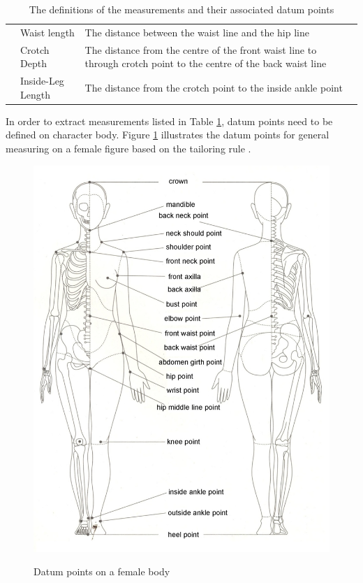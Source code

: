 \begin{table}[H]
\begin{tabular}{|m{0.5cm}|m{3cm}|m{8.5cm}|}
   \cline{2-3}	
   										& Waist length & The distance between the waist line and the hip line\\

   \cline{2-3}							
   										& Crotch Depth & The distance from the centre of the front waist line to through crotch point to the centre of the back waist line\\
   \cline{2-3}
   										& Inside-Leg Length & The distance from the crotch point to the inside ankle point\\ 																				 										  																										\hline
        \end{tabular}
        \caption{The definitions of the measurements and their associated datum points }
        \label{table:measurements} 
\end{table}
\renewcommand{\arraystretch}{1}%
\renewcommand{\baselinestretch}{1.5}

In order to extract measurements listed in Table \ref{table:measurements}, datum points need to be defined on character body. Figure \ref{figure:body_datum} illustrates the datum points for general measuring on a female figure based on the tailoring rule \citep{xiong2000}.

\begin{figure}[H]
	\includegraphics[width=\columnwidth]{../images/body_datum}\\[0.1cm]
    \caption{Datum points on a female body}
    \label{figure:body_datum}
\end{figure}
\pagebreak

